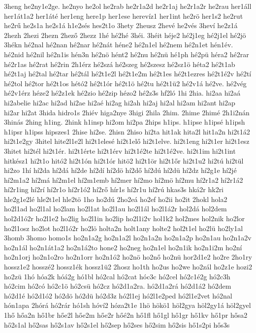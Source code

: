 {3heng
he2ny1e2ge.
he2nyo
he2ol
he2rab
he2r1a2d
he2r1aj
he2r1a2r
he2rau
her1áll
her1át1a2
her1áté
her1eng
here1p
her1ese
herevíz1
her1int
he2rö
her1s2
he2rut
he2rű
he2s1a
he2s1á
h1e2sés
hes2t1o
3hety
2heusz
2hevé
he2vés
3heví
he2z1á
2hezh
2hezi
2hezn
2hező
2hezz
1hé
hé2hé
3héi.
3héit
héje2
hé2j1eg
hé2j1el
hé2jö
3hékn
hé2nal
hé2nan
hé2nar
hé2nát
héne2
hé2n1el
hé2nem
hé2n1et
hén1év.
hé2nid
hé2nil
hé2n1is
hén3n
hé2nö
hént2
hé2nu
hé2nü
hé1ph
hé2pü
héra2
hé2rar
hé2r1as
hé2rat
hé2rin
2h1érz
hé2szá
hé2szeg
hé2szesz
hé2sz1ö
héta2
hé2t1ab
hé2t1aj
hé2tal
hé2tar
hé2tál
hé2t1e2l
hé2t1e2m
hé2t1es
hé2t1ezres
hé2t1é2v
hé2tí
hé2tol
hé2tor
hé2t1os
hétó2
hé2t1ór
hé2t1ö
hé2tu
hé2t1ü2
hé2v1á
hé2ve.
hé2vég
hé2v1érz
héze2
hé2z1ek
hé2zio
hé2zip
hézo2
hé2z3s
hf2ló
1hi
2hia.
hi2aa
hi2aá
hi2abelie
hi2ac
hi2ad
hi2ae
hi2aé
hi2ag
hi2ah
hi2aj
hi2al
hi2am
hi2ant
hi2ap
hi2ar
hi2at
3hida
hidro1s
2hiév
higa2nye
3higi
2hila
2him.
2hime
2himé
2h1i2nán
3hinás
2hing
h1ing.
2hink
h1insp
hi2om
hi2pa
2hips
h1ips.
h1ipse
h1ipsé
h1ipsh
h1ipsr
h1ipss
hipszes1
2hise
hi2se.
2hisn
2hiso
hi2ta
hit1ak
hita2l
hit1a2n
hi2t1á2
hi2t1e2gy
3hitel
hite2l1e2l
hi2t1elesé
hi2t1elő
hi2t1elve.
hi2t1eng
hi2t1er
hi2t1esz
3hitet
hi2tél
hi2t1ér.
hi2t1érte
hi2t1érv
hi2t1é2te
hi2t1é2ve.
hi2t1im
hi2t1int
hitkész1
hi2t1o
hitó2
hi2t1ón
hi2t1ór
hitö2
hi2t1ör
hi2t1őr
hi2t1u2
hi2tú
hi2tül
hi2zo
1hí
hí2da
hí2dá
hí2de
hí2dí
hí2dö
hí2dő
hí2dú
hí2dü
hí2dz
hí2g1e
hí2jé
hí2m1a2
hí2má
hí2m1el
hí2m1emb
hí2mer
hí2mo
hí2mö
hí2mu
hí2r1a2
hí2r1á2
hí2r1ing
hí2rí
hí2r1o
hí2r1ó2
hí2rő
hír1s
hí2r1u
hí2rú
hkas3s
hká2r
hk2ri
hle2g1e2lé
hle2t1el
hle2tö
1ho
ho2dú
2ho2eá
ho2ef
ho2ii
ho2it
2hokl
hola2
ho2l1ad
ho2l1al
ho2lam
ho2l1at
ho2l1au
ho2l1ál
ho2l1á2r
hol2dá
hol2dem
hol2d1ó2r
ho2l1e2
ho2lig
ho2l1in
ho2lip
ho2l1i2v
hol1k2
hol2mes
hol2nik
ho2lor
ho2l1osz
ho2lot
ho2l1ó2r
ho2lö
holta2n
holt1any
holte2
hol2t1el
ho2lü
ho2ly1al
3homb
3homo
homo1s
ho2n1a2g
ho2n1a2l
ho2n1a2n
ho2n1a2p
ho2n1au
ho2n1a2v
ho2n1ál
ho2n1át1a2
ho2n1á2to
hone2
ho2neg
ho2n1el
ho2n1ik
ho2n1i2m
ho2ní
ho2n1orj
ho2n1o2ro
ho2n1orr
ho2n1ó2
ho2nö
ho2nő
ho2nü
hor2d1e2
ho2re
2ho1ry
hossz1e2
hosszé2
hossz1ék
hossz1ü2
2hosz
ho1th
ho2us
ho2we
ho2zál
ho2z1e
hozi2
ho2zü
1hó
hóa2k
hóá2g
hó1bl
hó2cal
hó2cat
hóc3c
hó2cel
hó2c1é2g
hó2c3h
hó2cim
hó2có
hó2c1ö
hó2csü
hó2cz
hó2d1a2ra.
hó2d1a2rá
hó2d1á2
hó2dem
hó2d1é
hó2d1ó2
hó2dö
hó2dü
hó2d3z
hó2l1ej
hó2l1e2ped
hó2l1e2vet
hó2nal
hón1apa
2hórá
hó2rár
hó1sh
hóví2
hóza2t1e
1hö
hökö1
höl2gya
höl2gy1á
höl2gyel
1hő
hőa2n
hő1br
hőe2l
hőe2m
hőe2r
hőé2n
hő1fl
hő1gl
hő1gr
hő1kv
hő1pr
hősa2
hő2s1al
hő2sas
hő2s1av
hő2s1el
hő2sep
hő2ses
hő2sim
hő2sis
hő1s2pi
hős3s
}
